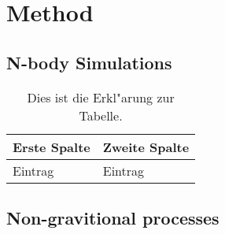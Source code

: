 \chapter{Method}

\lipsum[100]


\section{N-body Simulations}

\lipsum[100]



\begin{table}[htb]
\centering
\begin{tabular}{l|l}
Erste Spalte & Zweite Spalte \\ \hline
Eintrag & Eintrag
\end{tabular}
 \caption[Kurzform f"ur das Tabellenverzeichnis]{Dies ist die Erkl"arung zur Tabelle.}
\end{table}


\section{Non-gravitional processes}

\lipsum[100]

\lipsum[100]

\lipsum[100]
